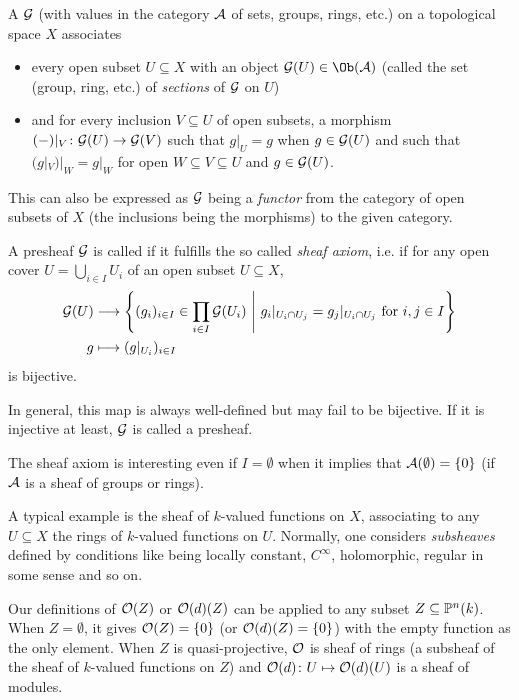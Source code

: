 \documentclass[a4paper,parskip=half,numbers=enddot, DIV=12]{scrreprt}
\begin{document}
\begin{defi}[Presheaf]
    A  $\mathcal{G}$ (with values in the category $\mathcal{A}$ of sets, groups, rings, etc.) on a topological space $X$ associates
    \begin{itemize}
    	\item every open subset $U\subseteq X$ with an object $\Gg(U)\in\Ob(\Aa)$ (called the set (group, ring, etc.) of \emph{sections} of $\mathcal{G}$ on  $U$)
    	\item and for every inclusion $V\subseteq U$ of open subsets, a morphism $(-)|_V\colon \Gg(U)\morphism \Gg(V)$ such that $g|_U = g$ when $g\in \mathcal{G}(U)$ and such that $(g|_V)|_W = g|_W$ for open $W\subseteq V\subseteq U$ and $g\in \mathcal{G}(U)$. 
    \end{itemize}
    This can also be expressed as $\mathcal{G}$ being a \emph{functor} from the category of open subsets of $X$ (the inclusions being the morphisms) to the given category.
\end{defi}

\begin{defi}[Sheaf]
    A presheaf $\mathcal{G}$ is called  if it fulfills the so called \emph{sheaf axiom}, i.e. if for any open cover $U = \bigcup_{i\in I} U_i$ of an open subset $U\subseteq X$,
    \begin{align*}
        \Gg(U) &\morphism \left\{(g_i)_{i\in I}\in \prod_{i\in I} \Gg(U_i)\st g_i|_{U_i\cap U_j} = g_j|_{U_i\cap U_j} \text{ for } i,j\in I\right\}\\
        g& \longmapsto (g|_{U_i})_{i\in I}
    \end{align*}
    is bijective. 
    
    In general, this map is always well-defined but may fail to be bijective. If it is injective at least, $\mathcal{G}$ is called a  presheaf.
\end{defi}
\begin{rem}
    \begin{alphanumerate}
        \item 
            The sheaf axiom is interesting even if $I=\emptyset$ when it implies that $\mathcal{A}(\emptyset) = \{0\}$ (if $\mathcal{A}$ is a sheaf of groups or rings).
        \item
            A typical example is the sheaf of $k$-valued functions on $X$, associating to any $U\subseteq X$ the rings of $k$-valued functions on $U$. Normally, one considers \emph{subsheaves} defined by conditions like being locally constant, $C^\infty$, holomorphic, regular in some sense and so on.
        \item 
            Our definitions of $\mathcal{O}(Z)$ or $\mathcal{O}(d)(Z)$ can be applied to any subset $Z\subseteq \mathbb{P}^n(k)$. When $Z=\emptyset$, it gives $\mathcal{O}(Z) = \{0\}$ (or $\mathcal{O}(d)(Z) = \{0\}$) with the empty function as the only element. When $Z$ is quasi-projective, $\mathcal{O}$ is sheaf of rings (a subsheaf of the sheaf of $k$-valued functions on $Z$) and $\mathcal{O}(d)\colon U\mapsto \mathcal{O}(d)(U)$ is a sheaf of modules.
    \end{alphanumerate}
\end{rem}
\end{document}
